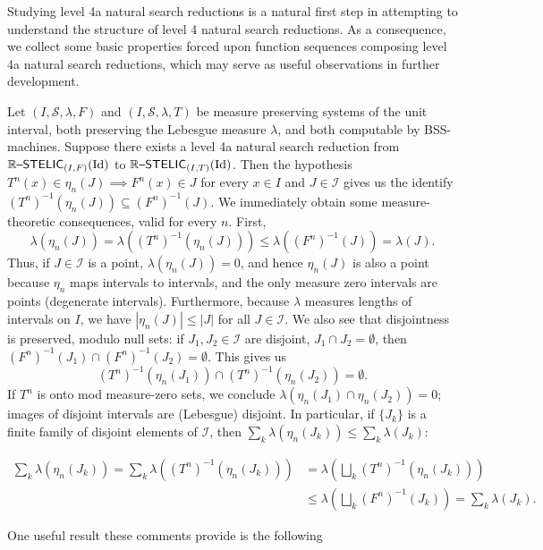 \documentclass{amsart}
\theoremstyle{theorem}
\theoremstyle{remark}
\DeclareMathOperator{\Id}{Id}
\newcommand{\ccRSTELIC}{\mathbb{R}\textsf{\upshape --STELIC}}
\newcommand{\cI}{\mathcal{I}}
\newcommand{\cS}{\mathcal{S}}
\begin{document}
Studying level 4a natural search reductions is a natural first step in attempting to understand the structure of level 4 natural search reductions.
As a consequence, we collect some basic properties forced upon function sequences composing level 4a natural search reductions, which may serve as useful observations in further development.

Let $(I, \cS, \lambda, F)$ and $(I, \cS, \lambda, T)$ be measure preserving  systems of the unit interval, both preserving the Lebesgue measure $\lambda$, and both computable by BSS-machines.
Suppose there exists a level 4a natural search reduction from $\ccRSTELIC_{(I, F)}(\Id)$ to $\ccRSTELIC_{(I, T)}(\Id)$.
Then the hypothesis $T^n(x) \in \eta_n(J) \implies F^n(x) \in J$ for every $x \in I$ and $J \in \cI$ gives us the identify $(T^n)^{-1}(\eta_n(J)) \subseteq (F^n)^{-1}(J)$. We immediately obtain some measure-theoretic consequences, valid for every $n$. First,
\[
\lambda(\eta_n(J)) = \lambda((T^n)^{-1}(\eta_n(J))) \leq \lambda ((F^n)^{-1}(J)) = \lambda(J).
\]
Thus, if $J \in \cI$ is a point, $\lambda(\eta_n(J)) = 0$, and hence $\eta_n(J)$ is also a point because $\eta_n$ maps intervals to intervals, and the only measure zero intervals are points (degenerate intervals). Furthermore, because $\lambda$ measures lengths of intervals on $I$, we have $|\eta_n(J)|\leq |J|$ for all $J \in \cI$.
We also see that disjointness is preserved, modulo null sets: if $J_1, J_2 \in \cI$ are disjoint, $J_1 \cap J_2 = \emptyset$, then $(F^n)^{-1}(J_1) \cap (F^n)^{-1}(J_2) = \emptyset$. This gives us
\[
(T^n)^{-1}(\eta_n(J_1)) \cap (T^n)^{-1}(\eta_n(J_2)) = \emptyset.
\]
If $T^n$ is onto mod measure-zero sets, we conclude $\lambda(\eta_n(J_1) \cap \eta_n(J_2)) = 0$; images of disjoint intervals are (Lebesgue) disjoint.
In particular, if $\{J_k\}$ is a finite family of disjoint elements of $\cI$, then $\sum_k\lambda(\eta_n(J_k)) \leq \sum_k \lambda(J_k)$:

\begin{align*}
\sum_k\lambda(\eta_n(J_k)) = \sum_k \lambda((T^n)^{-1}(\eta_n(J_k))) &= \lambda \left( \bigsqcup_k(T^n)^{-1}(\eta_n(J_k))\right)\\
&\leq \lambda\left(\bigsqcup_k(F^n)^{-1}(J_k)\right) = \sum_k \lambda(J_k).
\end{align*}

One useful result these comments provide is the following
\end{document}
